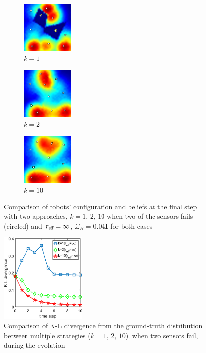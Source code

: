 \documentclass[letterpaper, 10 pt, conference]{ieeeconf}
\begin{document}
\begin{figure}
	\centering
	\begin{subfigure}[b]{0.15\textwidth}
		\centering
		\includegraphics[width=1in]{figure/fault_order_1_c}
		\caption{$k=1$}
	\end{subfigure}
	\begin{subfigure}[b]{0.15\textwidth}
		\centering
		\includegraphics[width=1in]{figure/fault_order_2_c}
		\caption{$k=2$}
	\end{subfigure}
	\begin{subfigure}[b]{0.15\textwidth}
	\centering
	\includegraphics[width=1in]{figure/fault_order_n_c}
	\caption{$k=10$}
\end{subfigure}
	\caption{Comparison of robots' configuration and beliefs at the final step with two approaches, $k=1, \,2,\,10$ when two of the sensors fails (circled) and $r_{\textup{eff}}=\infty$, $\Sigma_B = 0.04\mathbf{I}$ for both cases }
	\label{fig:fig6}
\end{figure}
\begin{figure}
	\centering
	\includegraphics[width=1.67in]{figure/fault_kl2}
	\caption{Comparison of K-L divergence from the ground-truth distribution between multiple strategies ($k=1,\,2,\,10$), when two sensors fail, during the evolution}
	\label{fig:fig7}
\end{figure}
\end{document}
